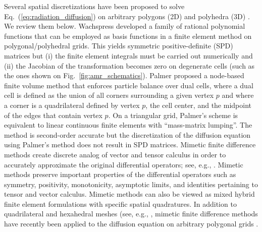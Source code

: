 \documentclass[preprint,10pt]{elsarticle}
\newcommand{\eqt}[1]{Eq.~(\ref{#1})}                     %
\newcommand{\fig}[1]{Fig.~\ref{#1}}                      %
\renewcommand{\(}{\left(}
\renewcommand{\)}{\right)}
\renewcommand{\[}{\left[}
\renewcommand{\]}{\right]}
\begin{document}
Several spatial discretizations have been proposed to solve \eqt{eq:radiation_diffusion} on
arbitrary polygons (2D) and polyhedra (3D) \cite{Wachspress,Kuznetsov2004,Palmer2005,Brezzi2005,
LipnikovShashkovSvyatskiy2006,BaileyAdams2008}. We review them below.
%
Wachspress \cite{Wachspress} developed a family of rational polynomial functions that can be employed
as basis functions in a finite element method on polygonal/polyhedral grids. This yields
symmetric positive-definite (SPD) matrices but (i) the finite element integrals must be carried out 
numerically and (ii) the Jacobian of the transformation becomes zero on degenerate cells 
(such as the ones shown on \fig{fig:amr_schematics}). 
%
Palmer \cite{Palmer2005,PalmerLLNL} proposed a node-based finite volume method 
that enforces particle balance over dual cells, where a dual cell is defined as 
the union of all corners surrounding a given vertex $p$ and where  a corner 
is a quadrilateral defined by vertex $p$, the cell center, and the midpoint
of the edges that contain vertex $p$. On a triangular grid, Palmer's scheme is equivalent 
to linear continuous finite elements with ``mass-matrix lumping''. The method is 
second-order accurate but the discretization of the diffusion equation using Palmer's method 
does not result in SPD matrices.
%
Mimetic finite difference methods create discrete analog of vector and tensor
calculus in order to accurately approximate the original differential operators;
see, e.g., \cite{HymanMorelShashkovSteinberg2002}.
Mimetic methods preserve important properties of the differential operators such 
as symmetry, positivity, monotonicity, asymptotic limits, and identities pertaining 
to tensor and vector calculus. Mimetic methods can also be viewed as mixed hybrid 
finite element formulations with specific spatial quadratures.  
In addition to quadrilateral and hexahedral meshes (see, e.g., 
\cite{MorelRobertsShashkov1998,MorelHallShashkov2001}, mimetic finite difference 
methods have recently been applied to the diffusion equation on arbitrary polygonal 
grids \cite{Kuznetsov2004,Brezzi2005,LipnikovShashkovSvyatskiy2006,LipnikovShashkov2010}.
\end{document}
